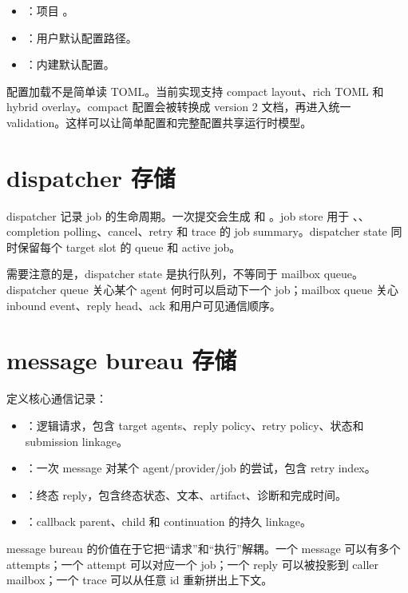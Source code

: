 \begin{itemize}
  \item {}：项目 。
  \item {}：用户默认配置路径。
  \item {}：内建默认配置。
\end{itemize}

配置加载不是简单读 TOML。当前实现支持 compact layout、rich TOML 和 hybrid overlay。compact 配置会被转换成 version 2 文档，再进入统一 validation。这样可以让简单配置和完整配置共享运行时模型。

\section{dispatcher 存储}

dispatcher 记录 job 的生命周期。一次提交会生成  和 。job store 用于 、、completion polling、cancel、retry 和 trace 的 job summary。dispatcher state 同时保留每个 target slot 的 queue 和 active job。

需要注意的是，dispatcher state 是执行队列，不等同于 mailbox queue。dispatcher queue 关心某个 agent 何时可以启动下一个 job；mailbox queue 关心 inbound event、reply head、ack 和用户可见通信顺序。

\section{message bureau 存储}

 定义核心通信记录：

\begin{itemize}
  \item {}：逻辑请求，包含 target agents、reply policy、retry policy、状态和 submission linkage。
  \item {}：一次 message 对某个 agent/provider/job 的尝试，包含 retry index。
  \item {}：终态 reply，包含终态状态、文本、artifact、诊断和完成时间。
  \item {}：callback parent、child 和 continuation 的持久 linkage。
\end{itemize}

message bureau 的价值在于它把“请求”和“执行”解耦。一个 message 可以有多个 attempts；一个 attempt 可以对应一个 job；一个 reply 可以被投影到 caller mailbox；一个 trace 可以从任意 id 重新拼出上下文。

